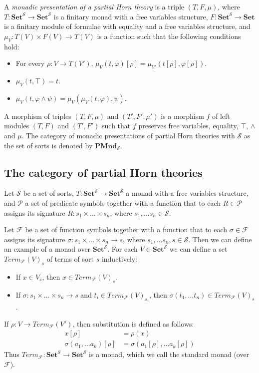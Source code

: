 \documentclass[reqno]{amsart}
\theoremstyle{definition}
\theoremstyle{remark}
\newcommand{\cat}[1]{\mathbf{#1}}
\newcommand{\Set}{\cat{Set}}
\newcommand{\PMnd}{\cat{PMnd}}
\numberwithin{figure}{section}
\begin{document}
\begin{defn}
A \emph{monadic presentation of a partial Horn theory} is a triple $(T,F,\mu)$, where
    $T : \Set^\mathcal{S} \to \Set^\mathcal{S}$ is a finitary monad with a free variables structure,
    $F : \Set^\mathcal{S} \to \Set$ is a finitary module of formulae with equality and a free variables structure, and
    $\mu_V : T(V) \times F(V) \to T(V)$ is a function such that the following conditions hold:
\begin{itemize}
\item For every $\rho : V \to T(V')$, $\mu_V(t,\varphi)[\rho] = \mu_{V'}(t[\rho],\varphi[\rho])$.
\item $\mu_V(t, \top) = t$.
\item $\mu_V(t, \varphi \land \psi) = \mu_V(\mu_V(t, \varphi), \psi)$.
\end{itemize}
A morphism of triples $(T,F,\mu)$ and $(T',F',\mu')$ is a morphism $f$ of left modules $(T,F)$ and $(T',F')$ such that $f$ preserves free variables, equality, $\top$, $\land$ and $\mu$.
The category of monadic presentations of partial Horn theories with $\mathcal{S}$ as the set of sorts is denoted by $\PMnd_\mathcal{S}$.
\end{defn}

\subsection{The category of partial Horn theories}

Let $\mathcal{S}$ be a set of sorts, $T : \Set^\mathcal{S} \to \Set^\mathcal{S}$ a monad with a free variables structure,
    and $\mathcal{P}$ a set of predicate symbols together with a function that to each $R \in \mathcal{P}$
    assigns its signature $R : s_1 \times \ldots \times s_n$, where $s_1, \ldots s_n \in \mathcal{S}$.

Let $\mathcal{F}$ be a set of function symbols together with a function that to each $\sigma \in \mathcal{F}$ assigns its signature $\sigma : s_1 \times \ldots \times s_n \to s$, where $s_1, \ldots s_n, s \in \mathcal{S}$.
Then we can define an example of a monad over $\Set^\mathcal{S}$.
For each $V \in \Set^\mathcal{S}$ we can define a set $Term_\mathcal{F}(V)_s$ of terms of sort $s$ inductively:
\begin{itemize}
\item If $x \in V_s$, then $x \in Term_\mathcal{F}(V)_s$.
\item If $\sigma : s_1 \times \ldots \times s_n \to s$ and $t_i \in Term_\mathcal{F}(V)_{s_i}$, then $\sigma(t_1, \ldots t_n) \in Term_\mathcal{F}(V)_s$.
\end{itemize}
If $\rho : V \to Term_\mathcal{F}(V')$, then substitution is defined as follows:
\begin{align*}
x[\rho] & = \rho(x) \\
\sigma(a_1, \ldots a_k)[\rho] & = \sigma(a_1[\rho], \ldots a_k[\rho])
\end{align*}
Thus $Term_\mathcal{F} : \Set^\mathcal{S} \to \Set^\mathcal{S}$ is a monad, which we call the standard monad (over $\mathcal{F}$).
\end{document}
